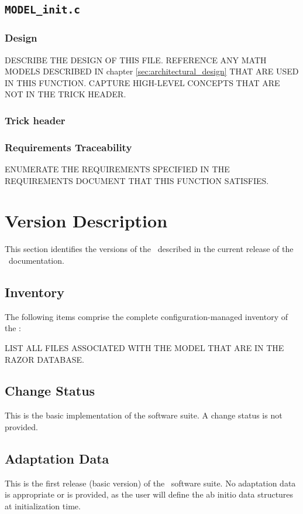 \documentclass[twoside,11pt,titlepage]{report}
\begin{document}
\section{\texorpdfstring{\tt MODEL\_init.c}{MODEL\_init.c}}

\subsection{Design}

DESCRIBE THE DESIGN OF THIS FILE. REFERENCE ANY MATH MODELS
DESCRIBED IN chapter \ref{sec:architectural_design} THAT
ARE USED IN THIS FUNCTION.
CAPTURE HIGH-LEVEL CONCEPTS THAT ARE NOT IN THE TRICK HEADER.

\subsection{Trick header}

% 

\subsection{Requirements Traceability}

ENUMERATE THE REQUIREMENTS SPECIFIED IN THE REQUIREMENTS
DOCUMENT THAT THIS FUNCTION SATISFIES.


\chapter{Version Description}\label{sec:versions}
This section identifies the versions of the
\MODEL\ described in the current release of the \MODEL\ documentation.

\section{Inventory}
The following items comprise the complete configuration-managed
inventory of the \MODEL:

LIST ALL FILES ASSOCIATED WITH THE MODEL THAT ARE IN THE RAZOR DATABASE.

\section{Change Status}
This is the basic implementation of the software suite.  A change
status is not provided.

\section{Adaptation Data}
This is the first release (basic version) of the \MODEL\ software suite.
No adaptation data is appropriate or is provided, as the user will
define the ab initio data structures at initialization time.
\end{document}
